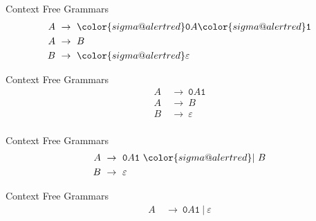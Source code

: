 \documentclass[aspectratio=169]{beamer}
\begin{document}
\begin{frame}{Context Free Grammars}
    {
    \LARGE
    \vspace{20pt}
    \begin{align*}
        A ~&\to~ {\color{sigma@alertred}\texttt{0}}A{\color{sigma@alertred}\texttt{1}} \\
        A ~&\to~ B                      \\
        B ~&\to~ {\color{sigma@alertred}\varepsilon}           \\
    \end{align*}
    }
\end{frame}

\begin{frame}{Context Free Grammars}
    {
    \LARGE
    \vspace{20pt}
    \begin{align*}
        A ~&\to~ \texttt{0}A\texttt{1} \\
        A ~&\to~ B                     \\
        B ~&\to~ \varepsilon           \\
    \end{align*}
    }
\end{frame}

\begin{frame}{Context Free Grammars}
    {
    \LARGE
    \vspace{30pt}
    \begin{align*}
        A ~&\to~ \texttt{0}A\texttt{1} ~{\color{sigma@alertred}|}~ B \\
        B ~&\to~ \varepsilon           \\
    \end{align*}
    }
\end{frame}

\begin{frame}{Context Free Grammars}
    {
    \LARGE
    \vspace{40pt}
    \begin{align*}
        A ~&\to~ \texttt{0}A\texttt{1} ~|~ \varepsilon \\
    \end{align*}
    }
\end{frame}
\end{document}
